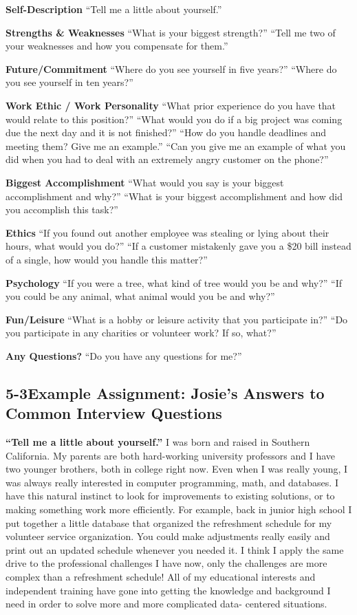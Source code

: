 \textbf{Self-Description}
\break ``Tell me a little about yourself.''

\textbf{Strengths \& Weaknesses}
\break ``What is your biggest strength?''
\break ``Tell me two of your weaknesses and how you compensate for them.''

\textbf{Future/Commitment}
\break ``Where do you see yourself in five years?'' 
\break ``Where do you see yourself in ten years?''

\textbf{Work Ethic / Work Personality}
\break ``What prior experience do you have that would relate to this position?''
\break ``What would you do if a big project was coming due the next day and it is not finished?'' 
\break ``How do you handle deadlines and meeting them? Give me an example.''
\break ``Can you give me an example of what you did when you had to deal with an extremely angry customer on the phone?''

\textbf{Biggest Accomplishment}
\break ``What would you say is your biggest accomplishment and why?''
\break ``What is your biggest accomplishment and how did you accomplish this task?''

\textbf{Ethics}
\break ``If you found out another employee was stealing or lying about their hours, what would you do?''
\break ``If a customer mistakenly gave you a \$20 bill instead of a single, how would you handle this matter?''

\textbf{Psychology}
\break ``If you were a tree, what kind of tree would you be and why?''
\break ``If you could be any animal, what animal would you be and why?''

\textbf{Fun/Leisure}
\break ``What is a hobby or leisure activity that you participate in?''
\break ``Do you participate in any charities or volunteer work? If so, what?''

\textbf{Any Questions?}
\break ``Do you have any questions for me?''
 
\pagebreak \subsection*{5-3\quad Example Assignment: Josie's Answers to Common Interview Questions}
\textbf{``Tell me a little about yourself.''}
\break I was born and raised in Southern California. My parents are both hard-working university professors and I have two younger brothers, both in college right now. Even when I was really young, I was always really interested in computer programming, math, and databases. I have this natural instinct to look for improvements to existing solutions, or to making something work more efficiently. For example, back in junior high school I put together a little database that organized the refreshment schedule for my volunteer service organization. You could make adjustments really easily and print out an updated schedule whenever you needed it. I think I apply the same drive to the professional challenges I have now, only the challenges are more complex than a refreshment schedule! All of my educational interests and independent training have gone into getting the knowledge and background I need in order to solve more and more complicated data- centered situations.

